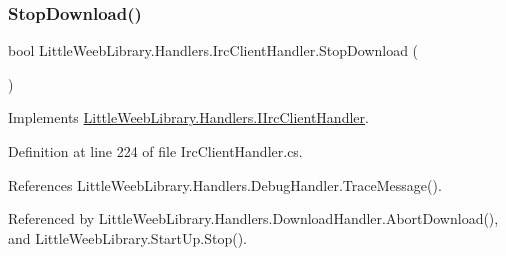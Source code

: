 \subsubsection{\texorpdfstring{Stop\+Download()}{StopDownload()}}
{\footnotesize\ttfamily bool Little\+Weeb\+Library.\+Handlers.\+Irc\+Client\+Handler.\+Stop\+Download (\begin{DoxyParamCaption}{ }\end{DoxyParamCaption})}



Implements \mbox{\hyperlink{interface_little_weeb_library_1_1_handlers_1_1_i_irc_client_handler_af1da0e6ed40f306b92dc0952c05cd1fe}{Little\+Weeb\+Library.\+Handlers.\+I\+Irc\+Client\+Handler}}.



Definition at line 224 of file Irc\+Client\+Handler.\+cs.



References Little\+Weeb\+Library.\+Handlers.\+Debug\+Handler.\+Trace\+Message().



Referenced by Little\+Weeb\+Library.\+Handlers.\+Download\+Handler.\+Abort\+Download(), and Little\+Weeb\+Library.\+Start\+Up.\+Stop().


